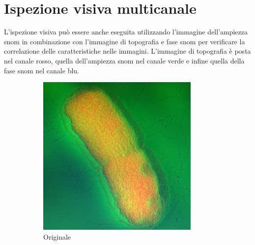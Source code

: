 \documentclass[../main.tex]{subfiles}
\begin{document}
\vfill
\newpage 

\section{Ispezione visiva multicanale}

L'ispezione visiva può essere anche eseguita utilizzando l'immagine dell'ampiezza \acrshort{snom} in combinazione con l'immagine di topografia e fase \acrshort{snom} per verificare la correlazione delle caratteristiche nelle immagini. L'immagine di topografia è posta nel canale rosso, quella dell'ampiezza \acrshort{snom} nel canale verde e infine quella della fase \acrshort{snom} nel canale blu.\\

\begin{figure}[h]
	\centering
	\begin{subfigure}{0.32\linewidth}
		\centering
		\includegraphics[keepaspectratio, width=\linewidth]{images/multi_orig.png}
		\caption{Originale}
	\end{subfigure}
	\begin{subfigure}{0.32\linewidth}
		\centering

\end{subfigure}
\end{figure}
\end{document}
